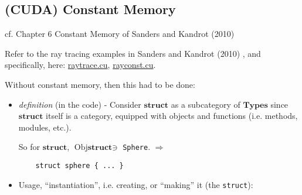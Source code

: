 \documentclass[10pt]{amsart}
\begin{document}
\begin{multicols*}{2}
\subsection{(CUDA) Constant Memory}
 
cf. Chapter 6 Constant Memory of Sanders and Kandrot (2010) \cite{SK2010}

Refer to the ray tracing examples in Sanders and Kandrot (2010) \cite{SK2010}, and specifically, here: \href{https://github.com/ernestyalumni/CompPhys/blob/master/CUDA-By-Example/raytrace.cu}{raytrace.cu}, \href{https://github.com/ernestyalumni/CompPhys/blob/master/CUDA-By-Example/rayconst.cu}{rayconst.cu}.

Without constant memory, then this had to be done: 

\begin{itemize}
\item \emph{definition} (in the code) - Consider $\textbf{struct}$ as a subcategory of $\textbf{Types}$ since $\textbf{struct}$ itself is a category, equipped with objects and functions (i.e. methods, modules, etc.).

  So for $\textbf{struct}$, $\text{Obj}\textbf{struct} \ni $ \verb|Sphere|.
  $\Longrightarrow $
  \begin{lstlisting}
    struct sphere { ... }
  \end{lstlisting}
\item Usage, ``instantiation'', i.e. creating, or ``making'' it (the \verb|struct|):


\end{itemize}
\end{multicols*}
\end{document}

